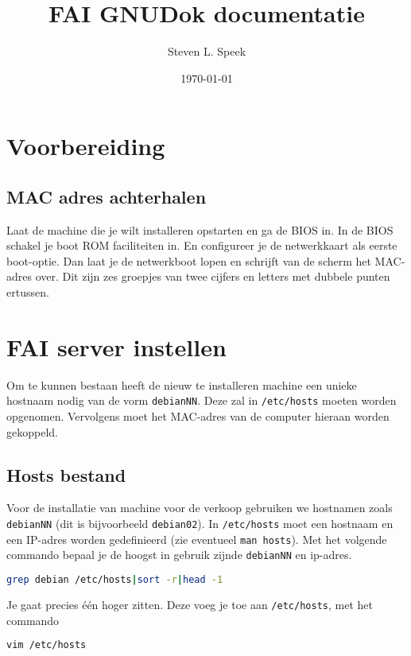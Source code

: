 \documentclass[11pt,a4paper]{article}
\begin{document}
\graphicspath{ {./images/} }
\lstset{language=bash} 
\author{Steven L. Speek}
\title{FAI GNUDok documentatie}
\date{\today}
\maketitle
{}

\section{Voorbereiding}
\subsection{MAC adres achterhalen}
Laat de machine die je wilt installeren opstarten en ga de BIOS in. In de BIOS schakel je boot ROM faciliteiten in. En configureer je de netwerkkaart als eerste boot-optie. Dan laat je de netwerkboot lopen en schrijft van de scherm het MAC-adres over. Dit zijn zes groepjes van twee cijfers en letters met dubbele punten ertussen. 

\section{FAI server instellen}
Om te kunnen bestaan heeft de nieuw te installeren machine een unieke hostnaam nodig van de vorm \texttt{debianNN}. Deze zal in \texttt{/etc/hosts} moeten worden opgenomen. Vervolgens moet het MAC-adres van de computer hieraan worden gekoppeld.
\subsection{Hosts bestand}
Voor de installatie van machine voor de verkoop gebruiken we hostnamen zoals \texttt{debianNN} (dit is bijvoorbeeld \texttt{debian02}).
In \texttt{/etc/hosts} moet een hostnaam en een IP-adres worden gedefinieerd (zie eventueel \texttt{man hosts}). Met het volgende commando bepaal je de hoogst in gebruik zijnde \texttt{debianNN} en ip-adres.  
\begin{lstlisting}[language=bash]
grep debian /etc/hosts|sort -r|head -1
\end{lstlisting}
Je gaat precies \'{e}\'{e}n hoger zitten. Deze voeg je toe aan \texttt{/etc/hosts}, met het commando
\begin{lstlisting}[language=bash]
vim /etc/hosts
\end{lstlisting}
\end{document}
